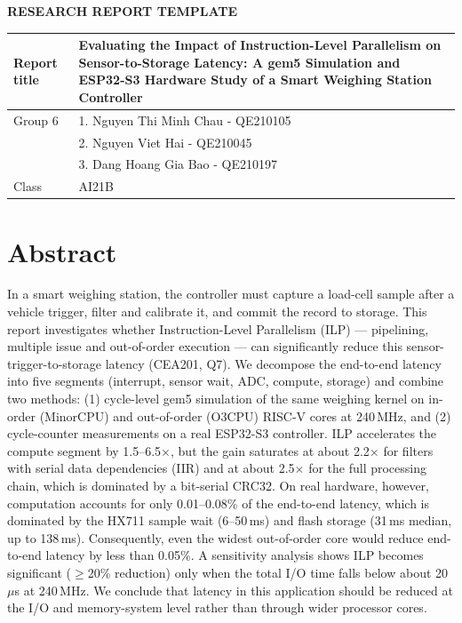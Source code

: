 \documentclass[12pt, a4paper]{article}
\begin{document}
\vspace{0.8cm}
\begin{center}
    \textbf{\Large RESEARCH REPORT TEMPLATE}
\end{center}
\vspace{0.5cm}
\noindent
\begin{tabularx}{\textwidth}{|p{4.5cm}|X|}
\hline
Report title & Evaluating the Impact of Instruction-Level Parallelism on Sensor-to-Storage Latency: A gem5 Simulation and ESP32-S3 Hardware Study of a Smart Weighing Station Controller \\
\hline
Group 6 & 1. Nguyen Thi Minh Chau - QE210105 \\
 & 2. Nguyen Viet Hai - QE210045 \\
 & 3. Dang Hoang Gia Bao - QE210197 \\
\hline
Class & AI21B \\
\hline
\end{tabularx}



\section*{Abstract}
In a smart weighing station, the controller must capture a load-cell sample after a vehicle trigger, filter and calibrate it, and commit the record to storage. This report investigates whether Instruction-Level Parallelism (ILP) --- pipelining, multiple issue and out-of-order execution --- can significantly reduce this sensor-trigger-to-storage latency (CEA201, Q7). We decompose the end-to-end latency into five segments (interrupt, sensor wait, ADC, compute, storage) and combine two methods: (1) cycle-level gem5 simulation of the same weighing kernel on in-order (MinorCPU) and out-of-order (O3CPU) RISC-V cores at 240\,MHz, and (2) cycle-counter measurements on a real ESP32-S3 controller. ILP accelerates the compute segment by 1.5--6.5$\times$, but the gain saturates at about 2.2$\times$ for filters with serial data dependencies (IIR) and at about 2.5$\times$ for the full processing chain, which is dominated by a bit-serial CRC32. On real hardware, however, computation accounts for only 0.01--0.08\% of the end-to-end latency, which is dominated by the HX711 sample wait (6--50\,ms) and flash storage (31\,ms median, up to 138\,ms). Consequently, even the widest out-of-order core would reduce end-to-end latency by less than 0.05\%. A sensitivity analysis shows ILP becomes significant ($\geq$20\% reduction) only when the total I/O time falls below about 20\,$\mu$s at 240\,MHz. We conclude that latency in this application should be reduced at the I/O and memory-system level rather than through wider processor cores.
\end{document}
